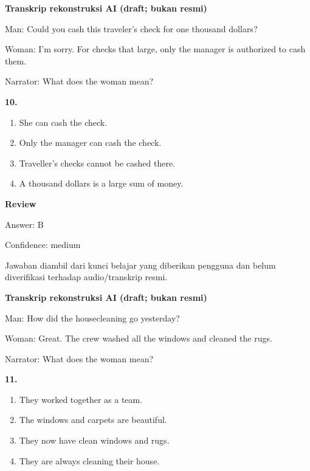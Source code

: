 \documentclass[12pt]{article}
\begin{document}
\vspace{0.25\baselineskip}
\begin{exampleblock}
\textbf{Transkrip rekonstruksi AI (draft; bukan resmi)}\par
Man: Could you cash this traveler's check for one thousand dollars?\par
Woman: I'm sorry. For checks that large, only the manager is authorized to cash them.\par
Narrator: What does the woman mean?\par
\end{exampleblock}
\noindent\textbf{10.}
\begin{enumerate}[label=(\Alph*),leftmargin=*,itemsep=0.2em]
\item She can cash the check.
\item Only the manager can cash the check.
\item Traveller's checks cannot be cashed there.
\item A thousand dollars is a large sum of money.
\end{enumerate}
\par
\begingroup
\setlength{\parskip}{0pt}
\setlength{\parindent}{0pt}
\textbf{Review}\par
Answer: B\par
Confidence: medium\par
Jawaban diambil dari kunci belajar yang diberikan pengguna dan belum diverifikasi terhadap audio/transkrip resmi.\par
\endgroup
\par
\vspace{0.25\baselineskip}
\begin{exampleblock}
\textbf{Transkrip rekonstruksi AI (draft; bukan resmi)}\par
Man: How did the housecleaning go yesterday?\par
Woman: Great. The crew washed all the windows and cleaned the rugs.\par
Narrator: What does the woman mean?\par
\end{exampleblock}
\noindent\textbf{11.}
\begin{enumerate}[label=(\Alph*),leftmargin=*,itemsep=0.2em]
\item They worked together as a team.
\item The windows and carpets are beautiful.
\item They now have clean windows and rugs.
\item They are always cleaning their house.
\end{enumerate}
\end{document}
